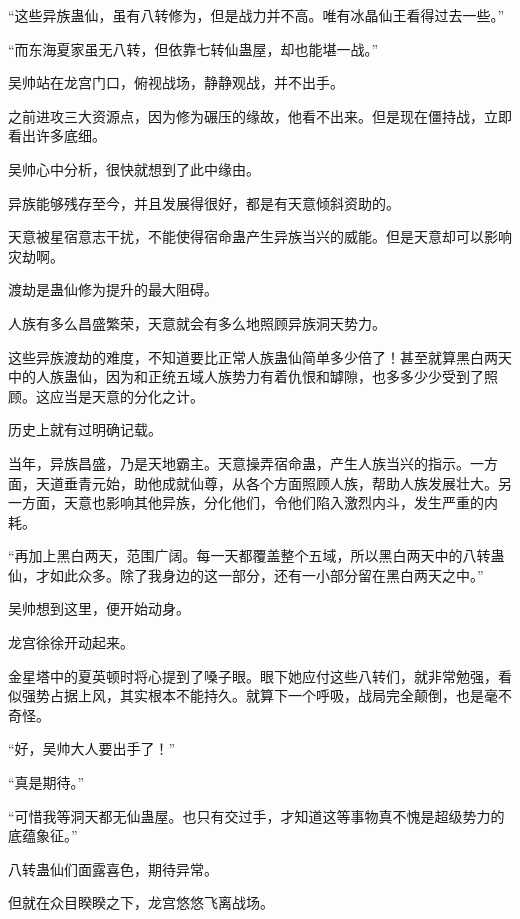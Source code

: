 
\begin{this_body}



“这些异族蛊仙，虽有八转修为，但是战力并不高。唯有冰晶仙王看得过去一些。”

“而东海夏家虽无八转，但依靠七转仙蛊屋，却也能堪一战。”

吴帅站在龙宫门口，俯视战场，静静观战，并不出手。

之前进攻三大资源点，因为修为碾压的缘故，他看不出来。但是现在僵持战，立即看出许多底细。

吴帅心中分析，很快就想到了此中缘由。

异族能够残存至今，并且发展得很好，都是有天意倾斜资助的。

天意被星宿意志干扰，不能使得宿命蛊产生异族当兴的威能。但是天意却可以影响灾劫啊。

渡劫是蛊仙修为提升的最大阻碍。

人族有多么昌盛繁荣，天意就会有多么地照顾异族洞天势力。

这些异族渡劫的难度，不知道要比正常人族蛊仙简单多少倍了！甚至就算黑白两天中的人族蛊仙，因为和正统五域人族势力有着仇恨和罅隙，也多多少少受到了照顾。这应当是天意的分化之计。

历史上就有过明确记载。

当年，异族昌盛，乃是天地霸主。天意操弄宿命蛊，产生人族当兴的指示。一方面，天道垂青元始，助他成就仙尊，从各个方面照顾人族，帮助人族发展壮大。另一方面，天意也影响其他异族，分化他们，令他们陷入激烈内斗，发生严重的内耗。

“再加上黑白两天，范围广阔。每一天都覆盖整个五域，所以黑白两天中的八转蛊仙，才如此众多。除了我身边的这一部分，还有一小部分留在黑白两天之中。”

吴帅想到这里，便开始动身。

龙宫徐徐开动起来。

金星塔中的夏英顿时将心提到了嗓子眼。眼下她应付这些八转们，就非常勉强，看似强势占据上风，其实根本不能持久。就算下一个呼吸，战局完全颠倒，也是毫不奇怪。

“好，吴帅大人要出手了！”

“真是期待。”

“可惜我等洞天都无仙蛊屋。也只有交过手，才知道这等事物真不愧是超级势力的底蕴象征。”

八转蛊仙们面露喜色，期待异常。

但就在众目睽睽之下，龙宫悠悠飞离战场。


\end{this_body}
